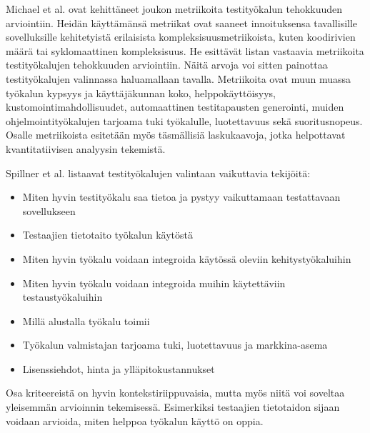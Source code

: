 Michael et al. \cite{michael02} ovat kehittäneet joukon metriikoita testityökalun tehokkuuden arviointiin. Heidän käyttämänsä metriikat ovat saaneet innoituksensa tavallisille sovelluksille kehitetyistä erilaisista kompleksisuusmetriikoista, kuten koodirivien määrä tai syklomaattinen kompleksisuus. He esittävät listan vastaavia metriikoita testityökalujen tehokkuuden arviointiin. Näitä arvoja voi sitten painottaa testityökalujen valinnassa haluamallaan tavalla. Metriikoita ovat muun muassa työkalun kypsyys ja käyttäjäkunnan koko, helppokäyttöisyys, kustomointimahdollisuudet, automaattinen testitapausten generointi, muiden ohjelmointityökalujen tarjoama tuki työkalulle, luotettavuus sekä suoritusnopeus. Osalle metriikoista esitetään myös täsmällisiä laskukaavoja, jotka helpottavat kvantitatiivisen analyysin tekemistä.

Spillner et al. \cite[218]{testing_foundations} listaavat testityökalujen valintaan vaikuttavia tekijöitä:
\begin{itemize}
  \itemsep0em
  \item Miten hyvin testityökalu saa tietoa ja pystyy vaikuttamaan testattavaan sovellukseen
  \item Testaajien tietotaito työkalun käytöstä
  \item Miten hyvin työkalu voidaan integroida käytössä oleviin kehitystyökaluihin
  \item Miten hyvin työkalu voidaan integroida muihin käytettäviin testaustyökaluihin
  \item Millä alustalla työkalu toimii
  \item Työkalun valmistajan tarjoama tuki, luotettavuus ja markkina-asema
  \item Lisenssiehdot, hinta ja ylläpitokustannukset
\end{itemize}

Osa kriteereistä on hyvin kontekstiriippuvaisia, mutta myös niitä voi soveltaa yleisemmän arvioinnin tekemisessä. Esimerkiksi testaajien tietotaidon sijaan voidaan arvioida, miten helppoa työkalun käyttö on oppia.